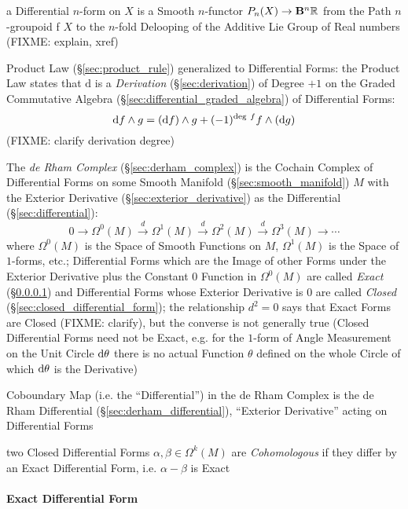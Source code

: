 a Differential $n$-form on $X$ is a Smooth $n$-functor $P_n(X) \rightarrow
\mathbf{B}^n\mathbb{R}$ from the Path $n$-groupoid f $X$ to the $n$-fold Delooping
of the Additive Lie Group of Real numbers (FIXME: explain, xref)

Product Law (\S\ref{sec:product_rule}) generalized to Differential Forms: the
Product Law states that $\mathrm{d}$ is a \emph{Derivation}
(\S\ref{sec:derivation}) of Degree $+1$ on the Graded Commutative Algebra
(\S\ref{sec:differential_graded_algebra}) of Differential Forms:
\[
\mathrm{d}f \wedge g = (\mathrm{d}f) \wedge g +
  (-1)^{\mathrm{deg}\ f}f \wedge (\mathrm{d}g)
\]
(FIXME: clarify derivation degree)

\asterism

The \emph{de Rham Complex} (\S\ref{sec:derham_complex}) is the Cochain Complex
of Differential Forms on some Smooth Manifold (\S\ref{sec:smooth_manifold}) $M$
with the Exterior Derivative (\S\ref{sec:exterior_derivative}) as the
Differential (\S\ref{sec:differential}):
\[
  0 \rightarrow \Omega^0(M) \xrightarrow{d} \Omega^1(M) \xrightarrow{d}
  \Omega^2(M) \xrightarrow{d} \Omega^3(M) \rightarrow \cdots
\]
where $\Omega^0(M)$ is the Space of Smooth Functions on $M$, $\Omega^1(M)$ is
the Space of $1$-forms, etc.; Differential Forms which are the Image of other
Forms under the Exterior Derivative plus the Constant $0$ Function in
$\Omega^0(M)$ are called \emph{Exact} (\S\ref{sec:exact_differential_form}) and
Differential Forms whose Exterior Derivative is $0$ are called \emph{Closed}
(\S\ref{sec:closed_differential_form}); the relationship $d^2 = 0$ says that
Exact Forms are Closed (FIXME: clarify), but the converse is not generally true
(Closed Differential Forms need not be Exact, e.g. for the $1$-form of Angle
Measurement on the Unit Circle $\mathrm{d}\theta$ there is no actual Function
$\theta$ defined on the whole Circle of which $\mathrm{d}\theta$ is the
Derivative)

Coboundary Map (i.e. the ``Differential'') in the de Rham Complex is the de Rham
Differential (\S\ref{sec:derham_differential}), ``Exterior Derivative'' acting
on Differential Forms

two Closed Differential Forms $\alpha, \beta \in \Omega^k(M)$ are
\emph{Cohomologous} if they differ by an Exact Differential Form, i.e. $\alpha -
\beta$ is Exact



\paragraph{Exact Differential Form}\label{sec:exact_differential_form}\hfill

